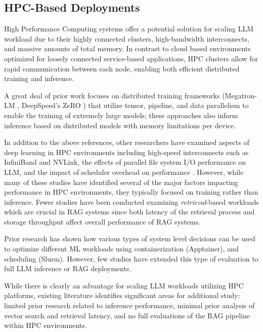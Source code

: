 \subsection{HPC-Based Deployments}

High Performance Computing systems offer a potential solution for scaling \ac{LLM} workload due to their highly connected clusters, high-bandwidth interconnects, and massive amounts of total memory. In contrast to cloud based environments optimized for loosely connected service-based applications, \ac{HPC} clusters allow for rapid communication between each node, enabling both efficient distributed training and inference.

A great deal of prior work focuses on distributed training frameworks (Megatron-LM \cite{shoeybi2019megatron}, DeepSpeed's ZeRO \cite{rajbhandari2020deepspeed}) that utilize tensor, pipeline, and data parallelism to enable the training of extremely large models; these approaches also inform inference based on distributed models with memory limitations per device.

In addition to the above references, other researchers have examined aspects of deep learning in \ac{HPC} environments including high-speed interconnects such as InfiniBand and NVLink, the effects of parallel file system \ac{I/O} performance on \ac{LLM}, and the impact of scheduler overhead on performance \cite{abdolrashidi2021large}. However, while many of these studies have identified several of the major factors impacting performance in HPC environments, they typically focused on training rather than inference. Fewer studies have been conducted examining \emph{retrieval}-based workloads which are crucial in \ac{RAG} systems since both latency of the retrieval process and storage throughput affect overall performance of \ac{RAG} systems.

Prior research has shown how various types of system level decisions can be used to optimize different ML workloads using containerization (Apptainer), and scheduling (Slurm). However, few studies have extended this type of evaluation to full \ac{LLM} inference or \ac{RAG} deployments.

While there is clearly an advantage for scaling \ac{LLM} workloads utilizing \ac{HPC} platforms, existing literature identifies significant areas for additional study: limited prior research related to inference performance, minimal prior analysis of vector search and retrieval latency, and no full evaluations of the \ac{RAG} pipeline within \ac{HPC} environments.

